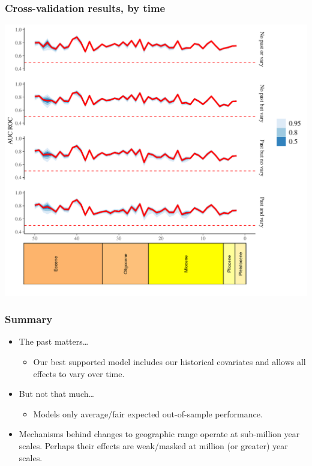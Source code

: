 \documentclass{beamer}
\begin{document}
\begin{frame}
  \frametitle{Cross-validation results, by time}

  \begin{center}
    \includegraphics[width=\textwidth,height=0.8\textheight,keepaspectratio=true]{../results/figure/fold_auc_time}
  \end{center}

\end{frame}


\begin{frame}
  \frametitle{Summary}

  \begin{itemize}
    \item \alert{The past matters\dots} 
      \begin{itemize}
        \item Our best supported model includes our historical covariates and allows all effects to vary over time.
      \end{itemize}
    \item \alert{But not that much\dots}
      \begin{itemize}
        \item Models only average/fair expected out-of-sample performance.
      \end{itemize}
    \item Mechanisms behind changes to geographic range operate at sub-million year scales. Perhaps their effects are weak/masked at million (or greater) year scales.
  \end{itemize}

\end{frame}
\end{document}
